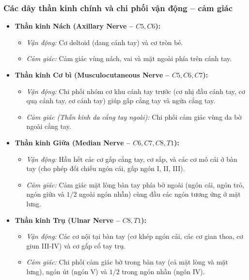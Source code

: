 \subsubsection{Các dây thần kinh chính và chi phối vận động -- cảm giác}

\begin{itemize}
    \item \textbf{Thần kinh Nách (Axillary Nerve -- $C5, C6$):}
    \begin{itemize}
        \item \textit{Vận động:} Cơ deltoid (dang cánh tay) và cơ tròn bé.
        \item \textit{Cảm giác:} Cảm giác vùng nách, vai và mặt ngoài phía trên cánh tay.
    \end{itemize}

    \item \textbf{Thần kinh Cơ bì (Musculocutaneous Nerve -- $C5, C6, C7$):}
    \begin{itemize}
        \item \textit{Vận động:} Chi phối nhóm cơ khu cánh tay trước (cơ nhị đầu cánh tay, cơ quạ cánh tay, cơ cánh tay) giúp gấp cẳng tay và ngửa cẳng tay.
        \item \textit{Cảm giác (Thần kinh da cẳng tay ngoài):} Chi phối cảm giác vùng da bờ ngoài cẳng tay.
    \end{itemize}

    \item \textbf{Thần kinh Giữa (Median Nerve -- $C6, C7, C8, T1$):}
    \begin{itemize}
        \item \textit{Vận động:} Hầu hết các cơ gấp cẳng tay, cơ sấp, và các cơ mô cái ở bàn tay (cho phép đối chiếu ngón cái, gấp ngón I, II, III).
        \item \textit{Cảm giác:} Cảm giác mặt lòng bàn tay phía bờ ngoài (ngón cái, ngón trỏ, ngón giữa và $1/2$ ngoài ngón nhẫn) cùng đầu các ngón tương ứng ở mặt lưng.
    \end{itemize}

    \item \textbf{Thần kinh Trụ (Ulnar Nerve -- $C8, T1$):}
    \begin{itemize}
        \item \textit{Vận động:} Các cơ nội tại bàn tay (cơ khép ngón cái, các cơ gian thoa, cơ giun III-IV) và cơ gấp cổ tay trụ.
        \item \textit{Cảm giác:} Chi phối cảm giác bờ trong bàn tay (cả mặt lòng và mặt lưng), ngón út (ngón V) và $1/2$ trong ngón nhẫn (ngón IV).
    \end{itemize}


\end{itemize}
